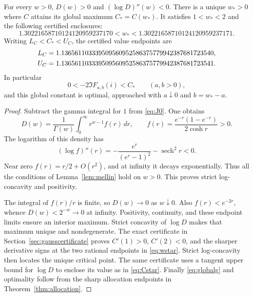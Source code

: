 \begin{theorem}
\label{thm:globalenvelope}
For every $w>0$, $D(w)>0$ and $(\log D)''(w)<0$. There is a unique
$w_*>0$ where $C$ attains its global maximum $C_*=C(w_*)$.
It satisfies $1<w_*<2$ and the following certified enclosures:
\begin{equation}
 1.30221658710124120959237170
 <w_*<1.30221658710124120959237171.\label{eq:wstar}
\end{equation}
Writing $L_C<C_*<U_C$, the certified value endpoints are
\begin{align}
 L_C&=1.136561103339509560952586375779942387681723540,\notag\\
 U_C&=1.136561103339509560952586375779942387681723541.
 \label{eq:Cstar}
\end{align}
In particular
\begin{equation}\label{eq:globalg}
 0<-2\Im F_{a,b}(i)<C_*\qquad(a,b>0),
\end{equation}
and this global constant is optimal, approached with $a\downarrow0$
and $b=w_*-a$.
\end{theorem}
\begin{proof}
Subtract the gamma integral for $1$ from \eqref{eq:J0}. One obtains
\begin{equation}\label{eq:Dmellin}
 D(w)=\frac1{\Gamma(w)}\int_0^\infty r^{w-1}f(r)\,dr,
 \qquad f(r)=\frac{e^{-r}(1-e^{-r})}{2\cosh r}>0.
\end{equation}
The logarithm of this density has
\begin{equation}\label{eq:logfcurvature}
 (\log f)''(r)=-\frac{e^r}{(e^r-1)^2}-\operatorname{sech}^2r<0.
\end{equation}
Near zero $f(r)=r/2+O(r^2)$, and at infinity it decays exponentially.
Thus all the conditions of Lemma~\ref{lem:mellin} hold on $w>0$.
This proves strict log-concavity and positivity.

The integral of $f(r)/r$ is finite, so $D(w)\to0$ as $w\downarrow0$.
Also $f(r)<e^{-2r}$, whence $D(w)<2^{-w}\to0$ at infinity. Positivity,
continuity, and these endpoint limits ensure an interior maximum.
Strict concavity of $\log D$ makes that maximum unique and nondegenerate.
The exact certificate in Section~\ref{sec:gausscertificate} proves
$C'(1)>0$, $C'(2)<0$, and the sharper derivative signs at the two
rational endpoints in \eqref{eq:wstar}. Strict log-concavity then
locates the unique critical point. The same certificate uses a tangent
upper bound for $\log D$ to enclose its value as in \eqref{eq:Cstar}.
Finally \eqref{eq:globalg} and optimality follow from the sharp allocation
endpoints in Theorem~\ref{thm:allocation}.
\end{proof}

